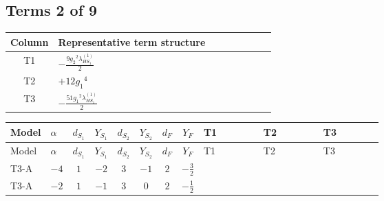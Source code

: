 \documentclass[8pt]{article}
\begin{document}
\begin{landscape}
\subsection*{Terms 2 of 9}
\begin{center}
\begin{tabular}{@{}c >{\raggedright\arraybackslash}p{0.82\linewidth}@{}}
\toprule
Column & Representative term structure \\
\midrule
T1 & \(\displaystyle -\frac{9 {g_2}^2 {\lambda_{HS_1}^{(1)}}}{2}\) \\
\midrule
T2 & \(\displaystyle +12 {g_1}^4\) \\
\midrule
T3 & \(\displaystyle -\frac{51 {g_1}^2 {\lambda_{HS_1}^{(1)}}}{2}\) \\
\midrule
\bottomrule
\end{tabular}
\end{center}
\smallskip
\tiny
\begin{longtable}{@{}llcccccc >{\raggedright\arraybackslash}p{0.21\linewidth} >{\raggedright\arraybackslash}p{0.21\linewidth} >{\raggedright\arraybackslash}p{0.21\linewidth}@{}}
\toprule
Model & $\alpha$ & $d_{S_1}$ & $Y_{S_1}$ & $d_{S_2}$ & $Y_{S_2}$ & $d_F$ & $Y_F$ & T1 & T2 & T3 \\
\midrule
\endfirsthead
\toprule
Model & $\alpha$ & $d_{S_1}$ & $Y_{S_1}$ & $d_{S_2}$ & $Y_{S_2}$ & $d_F$ & $Y_F$ & T1 & T2 & T3 \\
\midrule
\endhead
T3-A & $-4$ & $1$ & $-2$ & $3$ & $-1$ & $2$ & $-\frac{3}{2}$ & \scriptsize\adjustbox{max width=\linewidth}{$\begin{gathered} -\frac{9 {g_2}^2 {\lambda_{HS_1}^{(1)}}}{2}\end{gathered}$} & \scriptsize\adjustbox{max width=\linewidth}{$\begin{gathered} +12 {g_1}^4\end{gathered}$} & \scriptsize\adjustbox{max width=\linewidth}{$\begin{gathered} -\frac{51 {g_1}^2 {\lambda_{HS_1}^{(1)}}}{2}\end{gathered}$} \\
\midrule
T3-A & $-2$ & $1$ & $-1$ & $3$ & $0$ & $2$ & $-\frac{1}{2}$ & \scriptsize\adjustbox{max width=\linewidth}{$\begin{gathered} -\frac{9 {g_2}^2 {\lambda_{HS_1}^{(1)}}}{2}\end{gathered}$} & \scriptsize\adjustbox{max width=\linewidth}{$\begin{gathered} +3 {g_1}^4\end{gathered}$} & \scriptsize\adjustbox{max width=\linewidth}{$\begin{gathered} -\frac{15 {g_1}^2 {\lambda_{HS_1}^{(1)}}}{2}\end{gathered}$} \\

\end{longtable}
\end{landscape}
\end{document}
